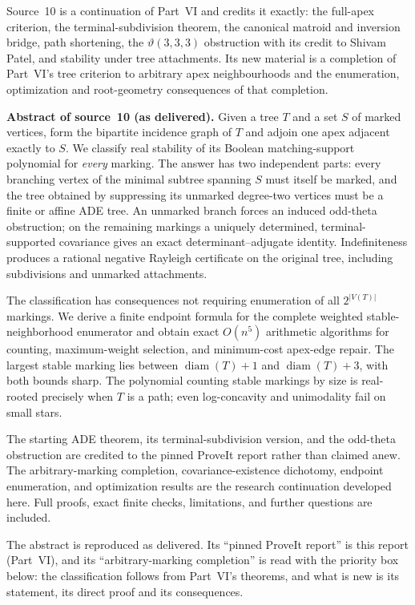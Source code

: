 \documentclass[11pt]{article}
\numberwithin{equation}{section}
\theoremstyle{definition}
\newcommand{\diam}{\operatorname{diam}}
\begin{document}
Source~10 is a continuation of Part~VI and credits it exactly: the
full-apex criterion, the terminal-subdivision theorem, the canonical
matroid and inversion bridge, path shortening, the $\vartheta(3,3,3)$
obstruction with its credit to Shivam Patel, and stability under tree
attachments. Its new material is a completion of Part~VI's tree criterion
to arbitrary apex neighbourhoods and the enumeration, optimization and
root-geometry consequences of that completion.

\begin{tcolorbox}[colback=white,colframe=Pale,arc=1mm]
\small\textbf{Abstract of source~10 (as delivered).}
Given a tree $T$ and a set $S$ of marked vertices, form the bipartite
incidence graph of $T$ and adjoin one apex adjacent exactly to $S$.
We classify real stability of its Boolean matching-support polynomial for
\emph{every} marking. The answer has two independent parts: every branching
vertex of the minimal subtree spanning $S$ must itself be marked, and the
tree obtained by suppressing its unmarked degree-two vertices must be a
finite or affine ADE tree. An unmarked branch forces an induced odd-theta
obstruction; on the remaining markings a uniquely determined,
terminal-supported covariance gives an exact determinant--adjugate identity.
Indefiniteness produces a rational negative Rayleigh certificate on the
original tree, including subdivisions and unmarked attachments.

The classification has consequences not requiring enumeration of all $2^{|V(T)|}$
markings. We derive a finite endpoint formula for the complete weighted
stable-neighborhood enumerator and obtain exact $O(n^5)$ arithmetic
algorithms for counting, maximum-weight selection, and minimum-cost
apex-edge repair. The largest stable marking lies between
$\diam(T)+1$ and $\diam(T)+3$, with both bounds sharp. The polynomial
counting stable markings by size is real-rooted precisely when $T$ is a
path; even log-concavity and unimodality fail on small stars.

The starting ADE theorem, its terminal-subdivision version, and the
odd-theta obstruction are credited to the pinned ProveIt report rather
than claimed anew. The arbitrary-marking completion, covariance-existence
dichotomy, endpoint enumeration, and optimization results are the research
continuation developed here. Full proofs, exact finite checks, limitations,
and further questions are included.
\end{tcolorbox}
\noindent The abstract is reproduced as delivered. Its ``pinned ProveIt
report'' is this report (Part~VI), and its ``arbitrary-marking completion''
is read with the priority box below: the classification follows from
Part~VI's theorems, and what is new is its statement, its direct proof and
its consequences.
\end{document}
